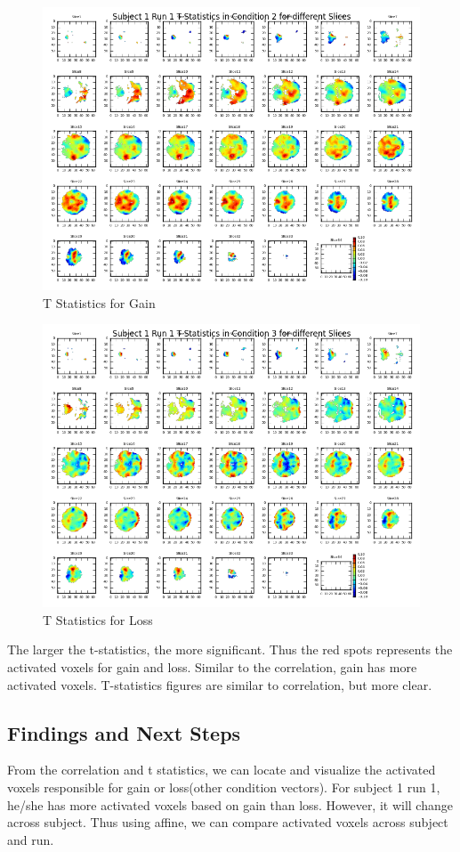 \begin{figure}[H]
    \centering
        \includegraphics[scale=0.5]{../plots/t_statistics_for_condition_2.png}	

    \caption{T Statistics for Gain}
\end{figure}


\begin{figure}[H]
    \centering
        \includegraphics[scale=0.5]{../plots/t_statistics_for_condition_3.png}
    \caption{T Statistics for Loss}
\end{figure}

\noindent
The larger the t-statistics, the more significant. Thus the red spots represents the activated voxels for gain and loss. Similar to the correlation,  gain has more activated voxels. T-statistics figures are similar to correlation, but more clear.





\subsection{Findings and Next Steps}
From the correlation and t statistics, we can locate and visualize the activated voxels responsible for gain or loss(other condition vectors). For subject 1 run 1, he/she has more activated voxels based on gain than loss. However, it will change across subject. Thus using affine, we can compare activated voxels across subject and run.
